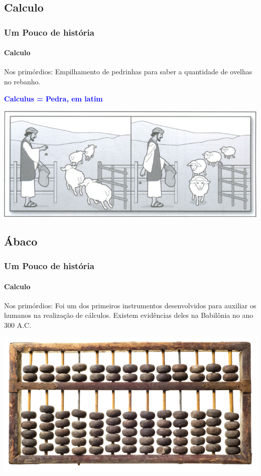 \documentclass[12pt,a4paper,final]{beamer}
\begin{document}
        \subsection{Calculo}
            \begin{frame}
                \frametitle{Um Pouco de história}
                \framesubtitle{Calculo}
                \begin{block}{Nos primórdios:}
                    Empilhamento de pedrinhas para saber a quantidade de ovelhas no rebanho.
                \end{block}
                \begin{block}{}
                    \centering
                    \textcolor{blue}{\large \textbf{Calculus = Pedra, em latim}}
                \end{block}
                \begin{block}{}
                     \centering
                     \includegraphics[scale=0.4]{Imagens/ovelhas.png}
                \end{block}
            \end{frame}
        \subsection{Ábaco}
            \begin{frame}
                \frametitle{Um Pouco de história}
                \framesubtitle{Calculo}
                \begin{block}{Nos primórdios:}
                   Foi um dos primeiros instrumentos desenvolvidos para auxiliar os humanos na realização de cálculos. Existem evidências deles na Babilônia no ano 300 A.C.
                \end{block}
                \begin{block}{}
                     \centering
                     \includegraphics[scale=1.2]{Imagens/abaco.png}
                \end{block}
            \end{frame}
\end{document}
